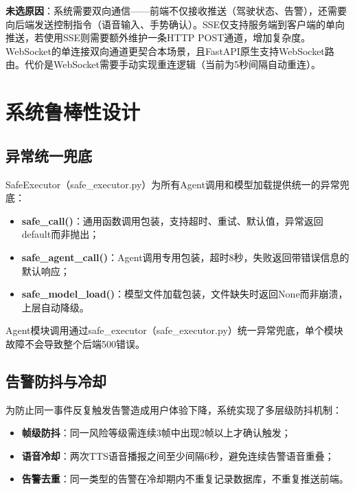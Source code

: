 \documentclass[a4paper]{article}
\begin{document}
\textbf{未选原因}：系统需要双向通信——前端不仅接收推送（驾驶状态、告警），还需要向后端发送控制指令（语音输入、手势确认）。SSE仅支持服务端到客户端的单向推送，若使用SSE则需要额外维护一条HTTP POST通道，增加复杂度。WebSocket的单连接双向通道更契合本场景，且FastAPI原生支持WebSocket路由。代价是WebSocket需要手动实现重连逻辑（当前为5秒间隔自动重连）。

\section{系统鲁棒性设计}

\subsection{异常统一兜底}

SafeExecutor（safe\_executor.py）为所有Agent调用和模型加载提供统一的异常兜底：

\begin{itemize}
    \item \textbf{safe\_call()}：通用函数调用包装，支持超时、重试、默认值，异常返回default而非抛出；
    \item \textbf{safe\_agent\_call()}：Agent调用专用包装，超时8秒，失败返回带错误信息的默认响应；
    \item \textbf{safe\_model\_load()}：模型文件加载包装，文件缺失时返回None而非崩溃，上层自动降级。
\end{itemize}

Agent模块调用通过safe\_executor（safe\_executor.py）统一异常兜底，单个模块故障不会导致整个后端500错误。

\subsection{告警防抖与冷却}

为防止同一事件反复触发告警造成用户体验下降，系统实现了多层级防抖机制：

\begin{itemize}
    \item \textbf{帧级防抖}：同一风险等级需连续3帧中出现2帧以上才确认触发；
    \item \textbf{语音冷却}：两次TTS语音播报之间至少间隔6秒，避免连续告警语音重叠；
    \item \textbf{告警去重}：同一类型的告警在冷却期内不重复记录数据库，不重复推送前端。
\end{itemize}
\end{document}
